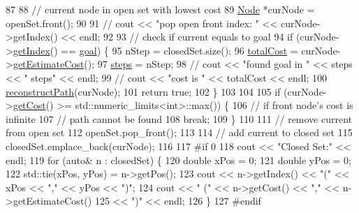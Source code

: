 \begin{DoxyCode}
87 
88         \textcolor{comment}{// current node in open set with lowest cost}
89         \hyperlink{classNode}{Node} *curNode = openSet.front();
90 
91         \textcolor{comment}{// cout << "pop open front index: " << curNode->getIndex() << endl;}
92 
93         \textcolor{comment}{// check if current equals to goal}
94         \textcolor{keywordflow}{if} (curNode->\hyperlink{classNode_af157df6ef5c45d7ce978e9c7371c297e}{getIndex}() == \hyperlink{classPathFindingAlgorithm_ae8acf41f92ba72a969a44640c99fb8a4}{goal}) \{
95             nStep = closedSet.size();
96             \hyperlink{classPathFindingAlgorithm_ad6a91f82618d6a7a95900b5c63337837}{totalCost} = curNode->\hyperlink{classNode_a9c7e1456a27ec44e98d75ca1d2db21f1}{getEstimateCost}();
97             \hyperlink{classPathFindingAlgorithm_aa4d442ba7d2499f61e81b8c0fabc55a5}{steps} = nStep;
98             \textcolor{comment}{// cout << "found goal in " << steps << " steps" << endl;}
99             \textcolor{comment}{// cout << "cost is " << totalCost << endl;}
100             \hyperlink{classPathFindingAlgorithm_a334c5cfc5b40a1e8458eb960ff5f541c}{reconstructPath}(curNode);
101             \textcolor{keywordflow}{return} \textcolor{keyword}{true};
102         \}
103 
104 
105         \textcolor{keywordflow}{if} (curNode->\hyperlink{classNode_a06d6bc069a40309fb4d228af02dface4}{getCost}() >= std::numeric\_limits<int>::max()) \{
106             \textcolor{comment}{// if front node's cost is infinite}
107             \textcolor{comment}{// path cannot be found}
108             \textcolor{keywordflow}{break};
109         \}
110 
111         \textcolor{comment}{// remove current from open set}
112         openSet.pop\_front();
113 
114         \textcolor{comment}{// add current to closed set}
115         closedSet.emplace\_back(curNode);
116 
117 \textcolor{preprocessor}{#if 0}
118 \textcolor{preprocessor}{}        cout << \textcolor{stringliteral}{"Closed Set:"} << endl;
119         \textcolor{keywordflow}{for} (\textcolor{keyword}{auto}& n : closedSet) \{
120             \textcolor{keywordtype}{double} xPos = 0;
121             \textcolor{keywordtype}{double} yPos = 0;
122             std::tie(xPos, yPos) = n->getPos();
123             cout << n->getIndex() << \textcolor{stringliteral}{"("} << xPos << \textcolor{stringliteral}{","} << yPos << \textcolor{stringliteral}{")"};
124             cout << \textcolor{stringliteral}{" ("} << n->getCost() << \textcolor{stringliteral}{","} << n->getEstimateCost()
125                  << \textcolor{stringliteral}{")"} << endl;
126         \}
127 \textcolor{preprocessor}{#endif}

\end{DoxyCode}
